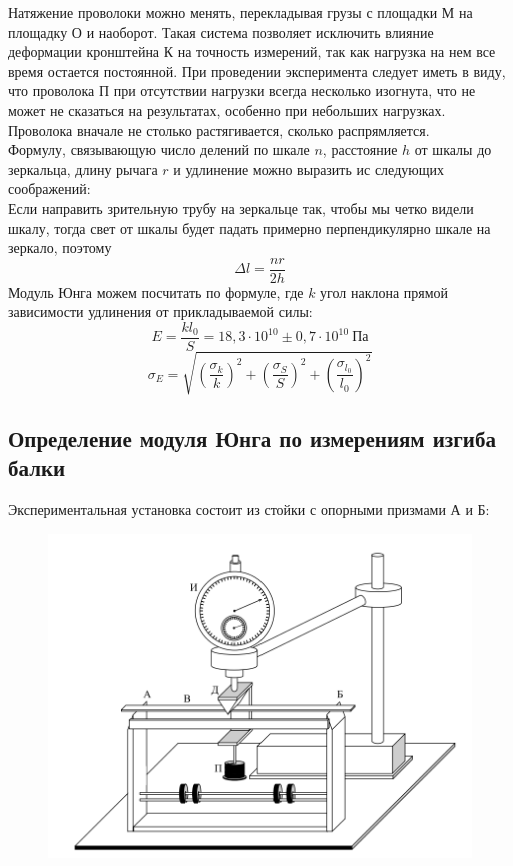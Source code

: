 \documentclass[a4paper,12pt]{article} %
\begin{document}
Натяжение проволоки можно менять, перекладывая грузы с площадки М на площадку О и наоборот. Такая система позволяет исключить влияние деформации кронштейна К на точность измерений, так как нагрузка на нем все время остается постоянной.
При проведении эксперимента следует иметь в виду, что проволока П при отсутствии нагрузки всегда несколько изогнута, что не может не сказаться на результатах, особенно при небольших нагрузках. Проволока вначале не столько растягивается, сколько распрямляется.\\
Формулу, связывающую число делений по шкале $n$, расстояние $h$ от шкалы до зеркальца, длину рычага $r$ и удлинение можно выразить ис следующих соображений:\\
Если направить зрительную трубу на зеркальце так, чтобы мы четко видели шкалу, тогда свет от шкалы будет падать примерно перпендикулярно шкале на зеркало, поэтому
\[
    \Delta l =\dfrac{nr}{2h}
\]
Модуль Юнга можем посчитать по формуле, где $k$ угол наклона прямой зависимости удлинения от прикладываемой силы:
\[
    E = \frac{kl_0}{S} = 18,3 \cdot 10^{10} \pm 0,7 \cdot 10^{10}~ \text{Па}
\]
\begin{equation}
    \sigma_E = \sqrt{\left( \dfrac{\sigma_{k}}{k} \right)^2 + \left( \dfrac{\sigma_{S}}{S} \right)^2 + \left( \dfrac{\sigma_{l_0}}{l_0} \right)^2 }
\end{equation}

\subsection{Определение модуля Юнга по измерениям изгиба балки}

Экспериментальная установка состоит из стойки с опорными призмами А и Б:

\begin{figure}[H]
    \centering
    \includegraphics[height=0.4\textheight]{images/2.png}
\end{figure}
\end{document}
